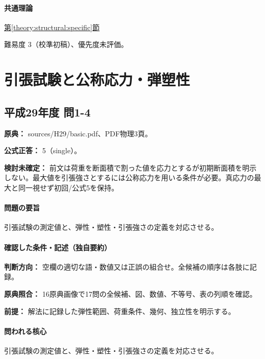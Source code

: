\paragraph{共通理論} \hyperref[theory:structural:specific]{第\ref*{theory:structural:specific}節}

\par 難易度 3（校準初稿）、優先度未評価。

\section{引張試験と公称応力・弾塑性}

\subsection{平成29年度 問1-4}
\label{q:h29-reg-basic-1-4}

\noindent\textbf{原典：} sources/H29/basic.pdf、PDF物理3頁。

\textbf{公式正答：} 5（single）。

\par\textbf{検討未確定：} 前文は荷重を断面積で割った値を応力とするが初期断面積を明示しない。最大値を引張強さとするには公称応力を用いる条件が必要。真応力の最大と同一視せず初回/公式5を保持。

\paragraph{問題の要旨} 引張試験の測定値と、弾性・塑性・引張強さの定義を対応させる。

\paragraph{確認した条件・記述（独自要約）}\mbox{}\par

\noindent\textbf{判断方向：} 空欄の適切な語・数値又は正誤の組合せ。全候補の順序は各肢に記録。\par

\noindent\textbf{原典照合：} 16原典画像で17問の全候補、図、数値、不等号、表の列順を確認。\par

\noindent\textbf{前提：} 解法に記録した弾性範囲、荷重条件、幾何、独立性を明示する。\par

\paragraph{問われる核心} 引張試験の測定値と、弾性・塑性・引張強さの定義を対応させる。

